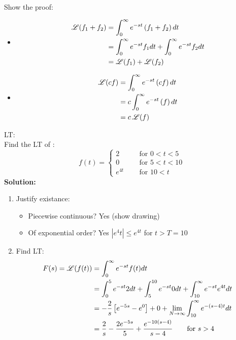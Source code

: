 Show the proof:
\begin{itemize}
\item 
\begin{align*}
\operatorname{\mathscr{L}} (f_1+f_2)&=\int^\infty_0 e^{-st}\left(f_1+f_2\right) dt\\
&=\int^\infty_0 e^{-st}f_1 dt+\int^\infty_0 e^{-st}f_2 dt\\
&=\operatorname{\mathscr{L}}(f_1)+\operatorname{\mathscr{L}}(f_2)
\end{align*}
\item 

\begin{align*}
\operatorname{\mathscr{L}} (cf)&=\int^\infty_0 e^{-st}\left(cf\right) dt\\
&=c\int^\infty_0 e^{-st}\left(f\right) dt\\
&=c\operatorname{\mathscr{L}}(f)
\end{align*}
\end{itemize}


\begin{exmp}{LT:}\\
Find the LT of :
\begin{equation*}
f(t)=
\begin{cases}
   2 \qquad &\text{for } 0<t<5\\
   0  &\text{for } 5<t<10 \\
   e^{4t} &\text{for } 10<t
\end{cases}
\end{equation*}
\textbf{Solution:}\\
\begin{enumerate}
\item Justify existance:
\begin{itemize}
\item Piecewise continuous? Yes (show drawing)
\item Of exponential order? Yes $\left|e^4t\right|\leq e^{4t}$ for $t>T=10$
\end{itemize}
\item Find LT:\\
\begin{align*}
F(s)=\operatorname{\mathscr{L}}(f(t))&=\int^\infty_0e^{-st}f(t) dt\\
&=\int^5_0e^{-st}2dt+\int^{10}_5 e^{-st} 0 dt + \int^\infty_{10} e^{-st} e^{4t}dt\\
&=-\frac{2}{s}\left[e^{-5s}-e^{0}\right]+0+\lim_{N\rightarrow \infty} \int^\infty_{10} e^{-(s-4)t}dt\\
&=\frac{2}{s}-\frac{2e^{-5s}}{5}+ \frac{e^{-10(s-4)}}{s-4} \qquad \text{for }s>4\\
\end{align*}

\end{enumerate}
\end{exmp}
